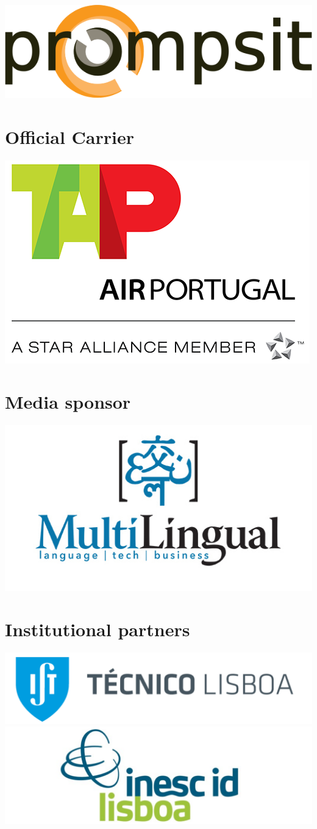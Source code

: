 \documentclass[a4paper,11pt,twoside]{book}
\begin{document}
\includegraphics[width=0.50\columnwidth]{logos/prompsit-logo.png}

\newpage

\section*{Official Carrier}
\begin{center}
\includegraphics[width=0.5\columnwidth]{logos/tapairpt-logo.png}
\end{center}

\vfill

\section*{Media sponsor}

\begin{center}
\includegraphics[width=0.55\columnwidth]{logos/multilingual-logo.jpg}
\end{center}

\vfill

\section*{Institutional partners}

\begin{center}
\includegraphics[width=0.6\columnwidth]{logos/ist-logo.png}\\

\includegraphics[width=0.6\columnwidth]{logos/inescid-logo.png}
\end{center}
\end{document}

